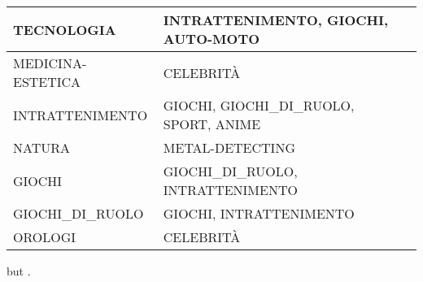 \documentclass[11pt]{article}
\begin{document}
\begin{table*}
\begin{tabular}{lll}
  TECNOLOGIA               & INTRATTENIMENTO, GIOCHI, AUTO-MOTO                                                                                                                    \\ \hline
  MEDICINA-ESTETICA        & CELEBRITÀ                                                                                                                                             \\ \hline
  INTRATTENIMENTO          & GIOCHI, GIOCHI\_DI\_RUOLO, SPORT, ANIME                                                                                                               \\ \hline
  NATURA                   & METAL-DETECTING                                                                                                                                       \\ \hline
  GIOCHI                   & GIOCHI\_DI\_RUOLO, INTRATTENIMENTO                                                                                                                    \\ \hline
  GIOCHI\_DI\_RUOLO        & GIOCHI, INTRATTENIMENTO                                                                                                                               \\ \hline
  OROLOGI                  & CELEBRITÀ                                                                                                                                             \\ \hline
  \end{tabular}
  \caption{Example commands for accented characters, to be used in, \emph{e.g.}, Bib\TeX{} entries.}
\end{table*}
 but .
\end{document}
